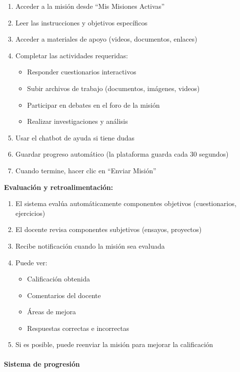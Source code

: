 \begin{enumerate}
	\item Acceder a la misión desde ``Mis Misiones Activas''
	\item Leer las instrucciones y objetivos específicos
	\item Acceder a materiales de apoyo (videos, documentos, enlaces)
	\item Completar las actividades requeridas:
	\begin{itemize}
		\item Responder cuestionarios interactivos
		\item Subir archivos de trabajo (documentos, imágenes, videos)
		\item Participar en debates en el foro de la misión
		\item Realizar investigaciones y análisis
	\end{itemize}
	\item Usar el chatbot de ayuda si tiene dudas
	\item Guardar progreso automático (la plataforma guarda cada 30 segundos)
	\item Cuando termine, hacer clic en ``Enviar Misión''
\end{enumerate}

\textbf{Evaluación y retroalimentación:}

\begin{enumerate}
	\item El sistema evalúa automáticamente componentes objetivos (cuestionarios, ejercicios)
	\item El docente revisa componentes subjetivos (ensayos, proyectos)
	\item Recibe notificación cuando la misión sea evaluada
	\item Puede ver:
	\begin{itemize}
		\item Calificación obtenida
		\item Comentarios del docente
		\item Áreas de mejora
		\item Respuestas correctas e incorrectas
	\end{itemize}
	\item Si es posible, puede reenviar la misión para mejorar la calificación
\end{enumerate}

\paragraph{Sistema de progresión}


